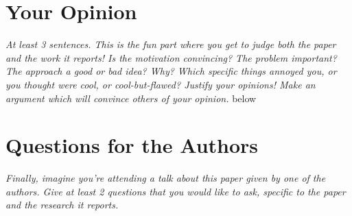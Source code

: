 \documentclass[11pt]{article}
\begin{document}
\section*{Your Opinion}

\textsl{At least 3 sentences. This is the fun part where you get to judge both
the paper and the work it reports! Is the motivation convincing? The problem
important? The approach a good or bad idea? Why? Which specific things annoyed
you, or you thought were cool, or cool-but-flawed? Justify your opinions! Make
an argument which will convince others of your opinion.}
below


\section*{Questions for the Authors}

\textsl{Finally, imagine you're attending a talk about this paper given by one
of the authors. Give at least 2 questions that you would like to ask, specific
to the paper and the research it reports.}




\end{document}

